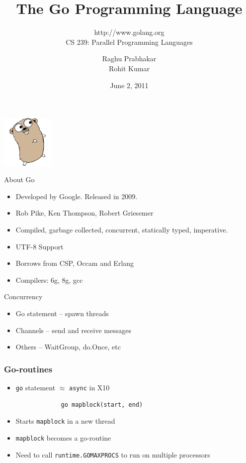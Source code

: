 \documentclass{beamer}
\title{The Go Programming Language}
\subtitle{http://www.golang.org \\ CS 239: Parallel Programming Languages}
\author{Raghu Prabhakar \\ Rohit Kumar}
\date{June 2, 2011}
\begin{document}
\begin{frame}
\begin{center}
\includegraphics[width=1in]{gopher.png}
\end{center}
\titlepage
\end{frame}

\begin{frame} {About Go}
\begin{itemize}
  \item Developed by Google. Released in 2009.
  \item Rob Pike, Ken Thompson, Robert Griesemer
  \item Compiled, garbage collected, concurrent, statically typed,
    imperative. 
  \item UTF-8 Support
  \item Borrows from CSP, Occam and Erlang
  \item Compilers: 6g, 8g, gcc 
\end{itemize}
\end{frame}

\begin{frame}{Concurrency}
  \begin{itemize}
    \item Go statement -- spawn threads
    \item Channels -- send and receive messages
    \item Others -- WaitGroup, do.Once, etc
  \end{itemize}
\end{frame}

\begin{frame} [fragile]
\frametitle{Go-routines}
\begin{itemize}
  \item \verb=go= statement $\approx$ \verb=async= in X10
\end{itemize}
\begin{center}
\begin{verbatim}
                go mapblock(start, end)
\end{verbatim}
\end{center}
\begin{itemize}
\item Starts \verb=mapblock= in a new thread
\item \verb=mapblock= becomes a go-routine
\item Need to call \verb=runtime.GOMAXPROCS= to run on multiple processors
\end{itemize}

\end{frame}
\end{document}
